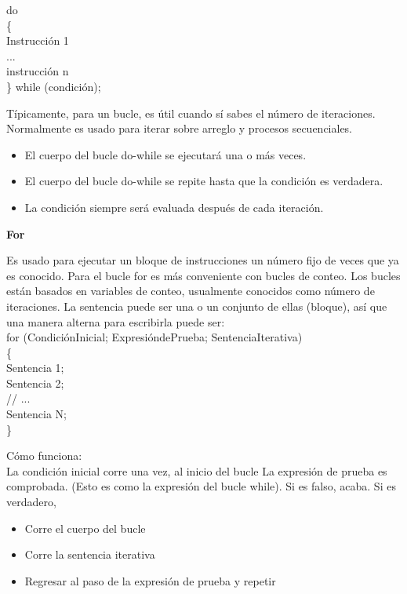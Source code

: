 \documentclass[11pt, letterpaper, spanish]{article}
\begin{document}
{{    do\\
    \{ \\
    Instrucción 1 \\
    ... \\
    instrucción n\\
    \} while (condición); \\
\par{Típicamente, para un bucle, es útil cuando sí sabes el número de iteraciones. Normalmente es usado para iterar sobre arreglo y procesos secuenciales.}
    \begin{itemize}
\item El cuerpo del bucle do-while se ejecutará una o más veces.
\item El cuerpo del bucle do-while se repite hasta que la condición es verdadera.
\item La condición siempre será evaluada después de cada iteración.
\end{itemize} \vspace{0.5 cm}
\textbf{For} \vspace{0.5 cm}
\par{Es usado para ejecutar un bloque de instrucciones un número fijo de veces que ya es conocido. Para el bucle for es más conveniente con bucles de conteo. Los bucles están basados en variables de conteo, usualmente conocidos como número de iteraciones. La sentencia puede ser una o un conjunto de ellas (bloque), así que una manera alterna para escribirla puede ser:}\\
    for (CondiciónInicial; ExpresióndePrueba; SentenciaIterativa)\\ 
 \{\\
    Sentencia 1;\\
    Sentencia 2;\\
    // ...\\
   Sentencia N;\\
 \}\\
\par{Cómo funciona:\\
La condición inicial corre una vez, al inicio del bucle
La expresión de prueba es comprobada. (Esto es como la expresión del bucle while). Si es falso, acaba. Si es verdadero,
\begin{itemize}
    \item Corre el cuerpo del bucle
    \item Corre la sentencia iterativa
    \item Regresar al paso de la expresión de prueba y repetir 
\end{itemize}
}
    
}}
\end{document}
